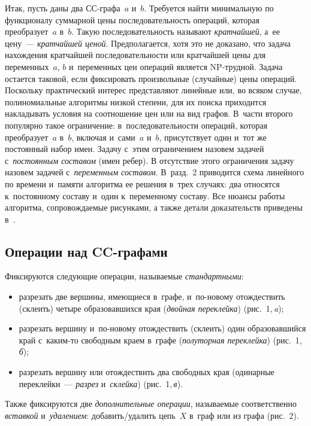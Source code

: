 \begin{multicols}{2}
  Итак, пусть даны два СС-гра\-фа~$a$ и~$b$. Требуется найти минимальную 
по функционалу суммарной цены последовательность операций, которая 
преобразует~$a$ в~$b$. Такую последовательность называют 
\textit{кратчайшей}, а~ее цену~--- \textit{кратчайшей ценой}. Предполагается, 
хотя это не доказано, что задача на\-хож\-де\-ния кратчайшей последовательности 
или кратчайшей цены для переменных~$a$, $b$ и~переменных цен операций 
является NP-труд\-ной. Задача остается таковой, если фиксировать 
произвольные (случайные) цены операций. Поскольку практический интерес 
представляют линейные или, во всяком случае, полиномиальные алгоритмы 
низкой степени, для их поиска приходится накладывать условия на 
соотношение цен или на вид графов. В~части второго популярно такое 
ограничение: в~последовательности операций, которая преобразует~$a$ в~$b$, 
включая и~сами~$a$ и~$b$, присутствует один и~тот же постоянный набор 
имен. Задачу с~этим ограничением назовем задачей с~\textit{постоянным  
со\-ста\-вом} (имен ребер). В отсутствие этого ограничения задачу назовем 
задачей с~\textit{переменным составом}. В~разд.~2 приводится схема 
линейного по времени и~памяти алгоритма ее решения в~трех случаях: два 
относятся к~постоянному составу и~один к~переменному составу. Все нюансы 
работы алгоритма, со\-про\-вож\-да\-емые рисунками, а также детали доказательств 
приведены в~\cite{1-gor, 2-gor}.
  
  \subsection{Операции над CC-графами}
  
   Фиксируются следующие операции, на\-зы\-ва\-емые \textit{стандартными}:
   \begin{itemize} 
\item разрезать две вершины, имеющиеся в~графе, и~по-но\-во\-му отождествить 
(склеить) четыре образовавшихся края (\textit{двойная переклейка}) 
(рис.~1,\,\textit{a});
\item разрезать вершину и~по-но\-во\-му отождествить (склеить) 
один образовавшийся край с~ка\-ким-то свободным краем в~графе 
(\textit{полуторная переклейка}) (рис.~1,\,\textit{б}); 
\item разрезать вершину или 
отождествить два свободных края (одинарные переклейки~--- \textit{разрез} 
и~\textit{склейка}) (рис.~1,\,\textit{в}).
\end{itemize}
  

  
  Также фиксируются две \textit{дополнительные операции}, называемые 
соответственно \textit{вставкой} и~\textit{удалением}: до\-ба\-вить/уда\-лить 
цепь~$X$ в~граф или из графа (рис.~2).
  


\end{multicols}
